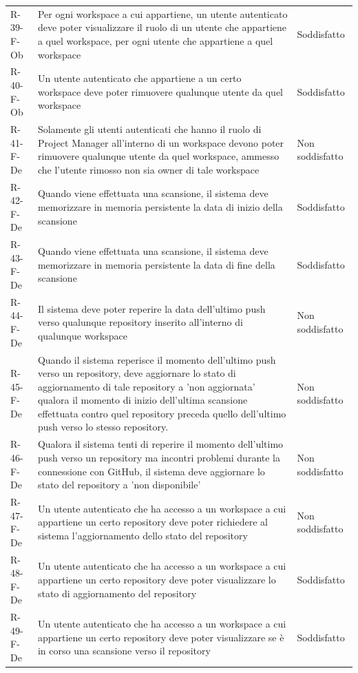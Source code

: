 \documentclass[a4paper, 11pt]{article}
\begin{document}
\begin{longtable}[c]{ >{\centering\arraybackslash}m{2.5cm} >{\centering\arraybackslash}m{8.3cm} >{\centering\arraybackslash}m{3.5cm} }
R-39-F-Ob & Per ogni workspace a cui appartiene, un utente autenticato deve poter visualizzare il ruolo di un utente che appartiene a quel workspace, per ogni utente che appartiene a quel workspace & Soddisfatto\\
R-40-F-Ob & Un utente autenticato che appartiene a un certo workspace deve poter rimuovere qualunque utente da quel workspace & Soddisfatto\\
R-41-F-De & Solamente gli utenti autenticati che hanno il ruolo di Project Manager all'interno di un workspace devono poter rimuovere qualunque utente da quel workspace, ammesso che l'utente rimosso non sia owner di tale workspace & Non soddisfatto\\
R-42-F-De & Quando viene effettuata una scansione, il sistema deve memorizzare in memoria persistente la data di inizio della scansione & Soddisfatto\\
R-43-F-De & Quando viene effettuata una scansione, il sistema deve memorizzare in memoria persistente la data di fine della scansione & Soddisfatto\\
R-44-F-De & Il sistema deve poter reperire la data dell'ultimo push verso qualunque repository inserito all'interno di qualunque workspace & Non soddisfatto\\
R-45-F-De & Quando il sistema reperisce il momento dell'ultimo push verso un repository, deve aggiornare lo stato di aggiornamento di tale repository a 'non aggiornata' qualora il momento di inizio dell'ultima scansione effettuata contro quel repository preceda quello dell'ultimo push verso lo stesso repository. & Non soddisfatto\\
R-46-F-De & Qualora il sistema tenti di reperire il momento dell'ultimo push verso un repository ma incontri problemi durante la connessione con GitHub, il sistema deve aggiornare lo stato del repository a 'non disponibile' & Non soddisfatto\\
R-47-F-De & Un utente autenticato che ha accesso a un workspace a cui appartiene un certo repository deve poter richiedere al sistema l'aggiornamento dello stato del repository & Non soddisfatto\\
R-48-F-De & Un utente autenticato che ha accesso a un workspace a cui appartiene un certo repository deve poter visualizzare lo stato di aggiornamento del repository & Soddisfatto\\
R-49-F-De & Un utente autenticato che ha accesso a un workspace a cui appartiene un certo repository deve poter visualizzare se è in corso una scansione verso il repository & Soddisfatto\\

\end{longtable}
\end{document}
